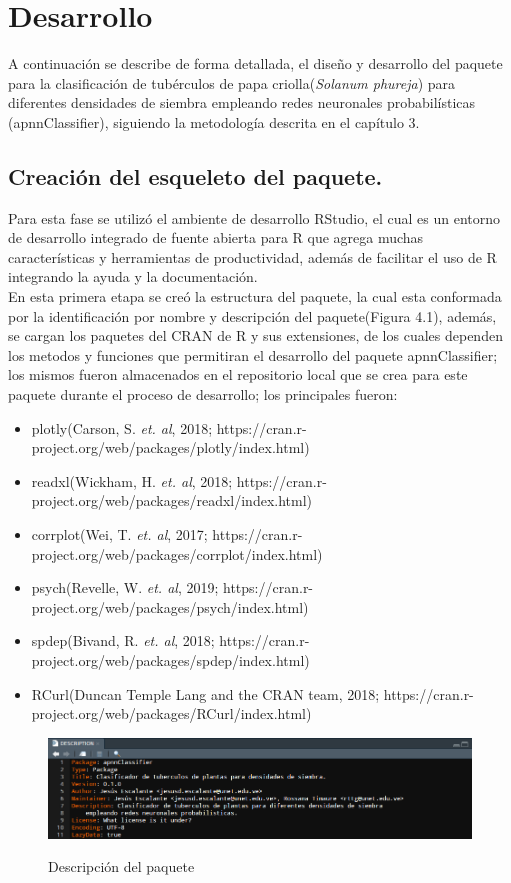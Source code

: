 \chapter{Desarrollo}

	A continuaci\'on se describe de forma detallada, el diseño y desarrollo del paquete para la clasificaci\'on de tub\'erculos de papa criolla(\textit{Solanum phureja}) para diferentes densidades de siembra empleando redes neuronales probabil\'isticas (apnnClassifier), siguiendo la metodolog\'ia descrita en el cap\'itulo 3.
	
\section{Creación del esqueleto del paquete.}
	
	Para esta fase se utilizó el ambiente de desarrollo RStudio, el cual es un entorno de desarrollo integrado de fuente abierta para R que agrega muchas caracter\'isticas y herramientas de productividad, además de facilitar el uso de R integrando la ayuda y la documentación.\\
En esta primera etapa se creó la estructura del paquete, la cual esta conformada por la identificación por nombre y descripción del paquete(Figura 4.1), además, se cargan los paquetes del CRAN de R y sus extensiones, de los cuales dependen los metodos y funciones que permitiran el desarrollo del paquete apnnClassifier; los mismos fueron almacenados en el repositorio local que se crea para este paquete durante el proceso de desarrollo; los principales fueron:\\

\begin{itemize}
\item plotly(Carson, S. \textit{et. al}, 2018; https://cran.r-project.org/web/packages/plotly/index.html)
\item readxl(Wickham, H. \textit{et. al}, 2018; https://cran.r-project.org/web/packages/readxl/index.html)
\item corrplot(Wei, T. \textit{et. al}, 2017; https://cran.r-project.org/web/packages/corrplot/index.html)
\item psych(Revelle, W. \textit{et. al}, 2019; https://cran.r-project.org/web/packages/psych/index.html)
\item spdep(Bivand, R. \textit{et. al}, 2018; https://cran.r-project.org/web/packages/spdep/index.html)
\item RCurl(Duncan Temple Lang and the CRAN team, 2018; https://cran.r-project.org/web/packages/RCurl/index.html)
\end{itemize}

\begin{figure}[h]
	\caption{Descripción del paquete}
	\centering
	\includegraphics[scale=0.5]{package-description.png}
	\label{fig:arch}
\end{figure}

